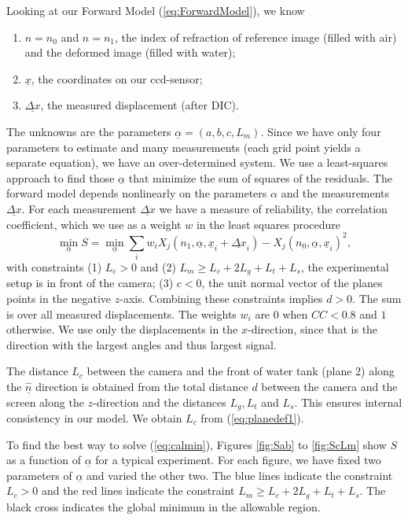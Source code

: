 \documentclass{article}
\begin{document}
Looking at our Forward Model (\ref{eq:ForwardModel}), we know
\begin{enumerate}
	\item $n=n_0$ and $n=n_1$, the index of refraction of reference image (filled with air) and the deformed image (filled with water); 
	\item $\underline{x}$, the coordinates on our ccd-sensor; 
	\item $\underline{\Delta x}$, the measured displacement (after DIC). 
\end{enumerate}
The unknowns are the parameters $\underline{\alpha} = (a, b, c, L_m)$. Since we have only four parameters to estimate and many measurements (each grid point yields a separate equation), we have an over-determined system. We use a least-squares approach to find those $\underline{\alpha}$ that minimize the sum of squares of the residuals. The forward model depends nonlinearly on the parameters $\alpha$ and the measurements $\underline{\Delta x}$. For each measurement $\underline{\Delta x}$ we have a measure of reliability, the correlation coefficient, which we use as a weight $w$ in the least squares procedure
\begin{equation}
\label{eq:calmin} 
\min_{\underline{\alpha}}  S = \min_{\underline{\alpha}} \sum_i w_i X_{j}(n_1, \underline{\alpha}, \underline{x}_i+\underline{\Delta x}_i) - X_{j}(n_0, \underline{\alpha}, \underline{x}_i)^2, 
\end{equation}
with constraints (1) $L_c > 0$ and (2) $L_m \geq L_c + 2 L_g + L_t + L_s$, the experimental setup is in front of the camera; (3) $c < 0$, the unit normal vector of the planes points in the negative $z$-axis. Combining these constraints implies $d>0$. The sum is over all measured displacements. The weights $w_i$ are $0$ when $CC < 0.8$ and $1$ otherwise. We use only the displacements in the $x$-direction, since that is the direction with the largest angles and thus largest signal.

The distance $L_c$ between the camera and the front of water tank (plane 2) along the $\underline{\hat{n}}$ direction is obtained from the total distance $d$ between the camera and the screen along the $z$-direction and the distances $L_g, L_t$ and $L_s$. This ensures internal consistency in our model. We obtain $L_c$ from (\ref{eq:planedef1}).

To find the best way to solve (\ref{eq:calmin}), Figures \ref{fig:Sab} to \ref{fig:ScLm} show $S$ as a function of $\underline{\alpha}$ for a typical experiment. For each figure, we have fixed two parameters of $\underline{\alpha}$ and varied the other two. The blue lines indicate the constraint $L_c >0$ and the red lines indicate the constraint $L_m \geq L_c + 2 L_g + L_t + L_s$. The black cross indicates the global minimum in the allowable region.
\end{document}
